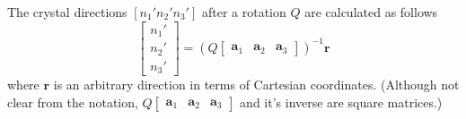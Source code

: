\documentclass[11pt,a4paper]{article}
\begin{document}
The crystal directions $[n_1' n_2' n_3']$ after a rotation $Q$ are calculated as follows
\begin{equation}
 \left[\begin{matrix} n_1' \\ n_2' \\ n_3' \end{matrix}\right] = 
 (Q \left[\begin{matrix} \mathbf{a}_1 & \mathbf{a}_2 & \mathbf{a}_3 \end{matrix} \right])^{-1} \mathbf{r}
\end{equation}
where $\mathbf{r}$ is an arbitrary direction in terms of Cartesian coordinates. (Although not clear from the notation, $Q \left[\begin{matrix} \mathbf{a}_1 & \mathbf{a}_2 & \mathbf{a}_3 \end{matrix} \right]$ and it's inverse are square matrices.)



\end{document}
